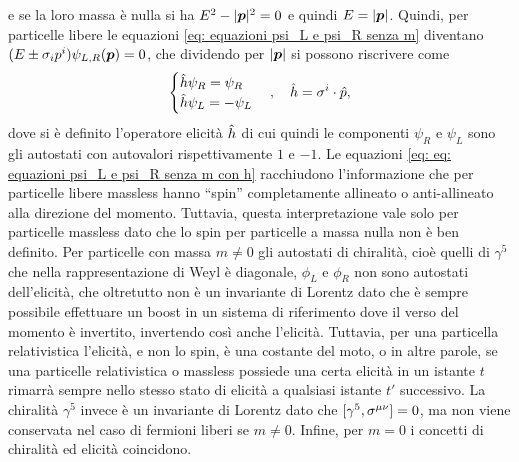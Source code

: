 e se la loro massa è nulla si ha $E^2 - |\bm{p}|^2 = 0$ e quindi $E = |\bm{p}|$. Quindi, per particelle libere le equazioni \eqref{eq: equazioni psi_L e psi_R senza m} diventano $(E \pm \sigma_ip^i)\psi_{L,R}(\bm{p}) = 0$, che dividendo per $|\bm{p}|$ si possono riscrivere come
\begin{equation}
\label{eq: eq: equazioni psi_L e psi_R senza m con h}
    \begin{cases}
        \hat{h}\psi_R = \psi_R \\
        \hat{h}\psi_L = -\psi_L
    \end{cases},\quad\hat{h} = \sigma^i\cdot\hat{p},
\end{equation}
dove si è definito l'operatore elicità $\hat{h}$ di cui quindi le componenti $\psi_R$ e $\psi_L$ sono gli autostati con autovalori rispettivamente $1$ e $-1$. Le equazioni \eqref{eq: eq: equazioni psi_L e psi_R senza m con h} racchiudono l'informazione che per particelle libere massless hanno ``spin'' completamente allineato o anti-allineato alla direzione del momento. Tuttavia, questa interpretazione vale solo per particelle massless dato che lo spin per particelle a massa nulla non è ben definito. Per particelle con massa $m\neq0$ gli autostati di chiralità, cioè quelli di $\gamma^5$ che nella rappresentazione di Weyl è diagonale, $\phi_L$ e $\phi_R$ non sono autostati dell'elicità, che oltretutto non è un invariante di Lorentz dato che è sempre possibile effettuare un boost in un sistema di riferimento dove il verso del momento è invertito, invertendo così anche l'elicità. Tuttavia, per una particella relativistica l'elicità, e non lo spin, è una costante del moto, o in altre parole, se una particelle relativistica o massless possiede una certa elicità in un istante $t$ rimarrà sempre nello stesso stato di elicità a qualsiasi istante $t'$ successivo. La chiralità $\gamma^5$ invece è un invariante di Lorentz dato che $[\gamma^5,\sigma^{\mu\nu}] = 0$, ma non viene conservata nel caso di fermioni liberi se $m\neq0$. Infine, per $m = 0$ i concetti di chiralità ed elicità coincidono.
